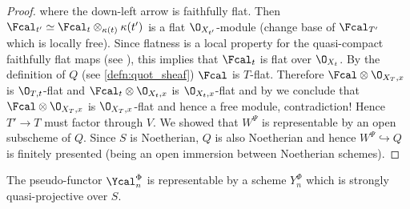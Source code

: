 \begin{proof}
            where the down-left arrow is faithfully flat. Then $\Fcal_{t'} \simeq \Fcal_t \otimes_{\kappa(t)} \kappa(t')$ is a flat $\O_{X_{t'}}$-module (change base of $\Fcal_{T'}$ which is locally free). Since flatness is a local property for the quasi-compact faithfully flat maps (see \cite[Tome~2, Proposition~2.7.1]{EGA4}), this implies that $\Fcal_t$ is flat over $\O_{X_t}$. By the definition of $Q$ (see \cref{defn:quot_sheaf}) $\Fcal$ is $T$-flat. Therefore $\Fcal \otimes \O_{X_T, x}$ is $\O_{T, t}$-flat and $\Fcal_t \otimes \O_{X_t, x}$ is $\O_{X_t, x}$-flat and by \cite[20.G]{Matsu} we conclude that $\Fcal \otimes \O_{X_T, x}$ is $\O_{X_T, x}$-flat and hence a free module, contradiction! Hence $T' \to T$ must factor through $V$. We showed that $W^{\Psi}$ is representable by an open subscheme of $Q$. Since $S$ is Noetherian, $Q$ is also Noetherian and hence $W^{\Psi} \hookrightarrow Q$ is finitely presented (being an open immersion between Noetherian schemes).
        \end{proof}
        \pagebreak
        \begin{lemma}
            \label{lemma:wang_4_1_10}
            The pseudo-functor $\Ycal_n^{\Phi}$ is representable by a scheme $Y_n^{\Phi}$ which is strongly quasi-projective over $S$.
        \end{lemma}
